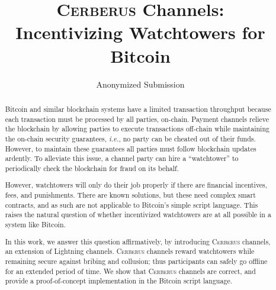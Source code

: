\documentclass[runningheads]{llncs}
\newcommand{\ie}{{\em i.e.}}
\newcommand{\sys}{\textsc{Cerberus}\xspace}
\begin{document}
\title{\sys Channels: \\ Incentivizing Watchtowers for Bitcoin}
\titlerunning{\sys channels}
%
\author{Anonymized Submission}
%
%
%

\date{}
\maketitle

%
%
\begin{abstract}
Bitcoin and similar blockchain systems have a limited transaction throughput because each transaction must be processed by all parties, on-chain.
Payment channels relieve the blockchain by allowing parties to execute transactions off-chain while maintaining the on-chain security guarantees, \ie, no party can be cheated out of their funds. However, to maintain these guarantees all parties must follow blockchain updates ardently.
To alleviate this issue, a channel party can hire a ``watchtower'' to periodically check the blockchain for fraud on its behalf.

However, watchtowers will only do their job properly if there are financial incentives, fees, and punishments. There are known solutions, but these need complex smart contracts, and as such are not applicable to Bitcoin's simple script language. This raises the natural question of whether incentivized watchtowers are at all possible in a system like Bitcoin.

In this work, we answer this question affirmatively, by introducing \sys channels, an extension of Lightning channels. \sys channels reward watchtowers while remaining secure against bribing and collusion; thus participants can safely go offline for an extended period of time.
We show that \sys channels are correct, and provide a proof-of-concept implementation in the Bitcoin script language.

\end{abstract}
\end{document}
